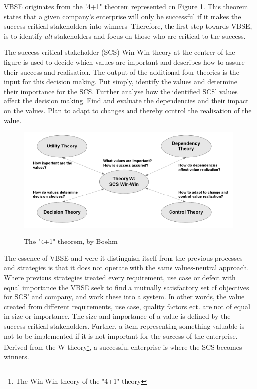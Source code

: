 \documentclass{sig-alternate}
\begin{document}
VBSE originates from the "4+1" theorem represented on Figure \ref{fig:fouronetheorem}. This theorem states that a given company's enterprise will only be successful if it makes the success-critical stakeholders into winners. Therefore, the first step towards VBSE, is to identify \textit{all} stakeholders and  focus on those who are critical to the success.

The success-critical stakeholder (SCS) Win-Win theory at the centrer of the figure is used to decide which values are important and describes how to assure their success and realisation. The output of the additional four theories is the input for this decision making. Put simply, identify the values and determine their importance for the SCS. Further analyse how the identified SCS' values affect the decision making. Find and evaluate the dependencies and their impact on the values. Plan to adapt to changes and thereby control the realization of the value.\cite{stefan:valuebased}

\begin{figure}
\caption{The "4+1" theorem, by Boehm}
\centering
\includegraphics[scale=0.6]{Umlet/4+1theorem}
\label{fig:fouronetheorem}
\end{figure} 

The essence of VBSE and were it distinguish itself from the previous processes and strategies is that it does not operate with the same values-neutral approach. Where previous strategies treated every requirement, use case or defect with equal importance the VBSE seek to find a mutually satisfactory set of objectives for SCS' and company, and work these into a system. In other words, the value created from different requirements, use case, quality factors ect. are not of equal in size or importance. The size and importance of a value is defined by the success-critical stakeholders. Further, a item representing something valuable is not to be implemented if it is not important for the success of the enterprise. Derived from the W theory\footnote{The Win-Win theory of the "4+1" theory}, a successful enterprise is where the SCS becomes winners. 
\end{document}

